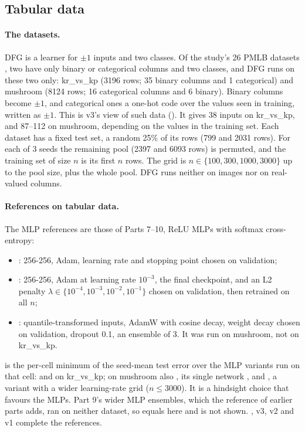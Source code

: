 \subsection{Tabular data}\label{app:tabular}

\paragraph{The datasets.} DFG is a learner for $\pm1$ inputs and two classes. Of the study's 26 PMLB datasets \cite{olson2017pmlb}, two have only binary or categorical columns and two classes, and DFG runs on these two only: kr\_vs\_kp (3196 rows; 35 binary columns and 1 categorical) and mushroom (8124 rows; 16 categorical columns and 6 binary). Binary columns become $\pm1$, and categorical ones a one-hot code over the values seen in training, written as $\pm1$. This is v3's view of such data (). It gives 38 inputs on kr\_vs\_kp, and 87--112 on mushroom, depending on the values in the training set. Each dataset has a fixed test set, a random 25\% of its rows (799 and 2031 rows). For each of 3 seeds the remaining pool (2397 and 6093 rows) is permuted, and the training set of size $n$ is its first $n$ rows. The grid is $n\in\{100,300,1000,3000\}$ up to the pool size, plus the whole pool. DFG runs neither on images nor on real-valued columns.

\paragraph{References on tabular data.} The MLP references are those of Parts 7--10, ReLU MLPs with softmax cross-entropy:
\begin{itemize}
\item {}: 256-256, Adam, learning rate and stopping point chosen on validation;
\item {}: 256-256, Adam at learning rate $10^{-3}$, the final checkpoint, and an L2 penalty $\lambda\in\{10^{-4},10^{-3},10^{-2},10^{-1}\}$ chosen on validation, then retrained on all $n$;
\item {}: quantile-transformed inputs, AdamW with cosine decay, weight decay chosen on validation, dropout 0.1, an ensemble of 3. It was run on mushroom, not on kr\_vs\_kp.
\end{itemize}
 is the per-cell minimum of the seed-mean test error over the MLP variants run on that cell:  and  on kr\_vs\_kp; on mushroom also , its single network , and , a variant with a wider learning-rate grid ($n\le3000$). It is a hindsight choice that favours the MLPs. Part 9's wider MLP ensembles, which the reference  of earlier parts adds, ran on neither dataset, so  equals  here and is not shown. , v3, v2 and v1 complete the references.

